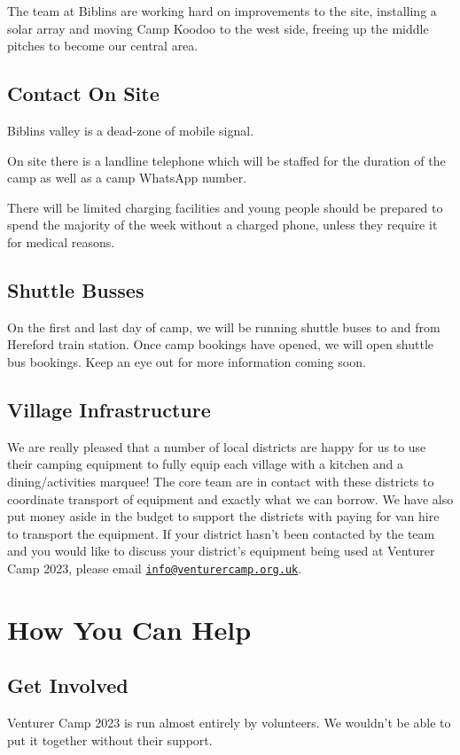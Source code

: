 \documentclass[a4paper, 10pt]{report}
\begin{document}
The team at Biblins are working hard on improvements to the site, installing a solar array and moving Camp Koodoo to the west side, freeing up the middle pitches to become our central area. 
\section{Contact On Site}
Biblins valley is a dead-zone of mobile signal.

On site there is a landline telephone which will be staffed for the duration of the camp as well as a camp WhatsApp number.

There will be limited charging facilities and young people should be prepared to spend the majority of the week without a charged phone, unless they require it for medical reasons.
\section{Shuttle Busses}
On the first and last day of camp, we will be running shuttle buses to and from Hereford train station. Once camp bookings have opened, we will open shuttle bus bookings. Keep an eye out for more information coming soon.
\section{Village Infrastructure}
We are really pleased that a number of local districts are happy for us to use their camping equipment to fully equip each village with a kitchen and a dining/activities marquee! The core team are in contact with these districts to coordinate transport of equipment and exactly what we can borrow. We have also put money aside in the budget to support the districts with paying for van hire to transport the equipment. If your district hasn't been contacted by the team and you would like to discuss your district's equipment being used at Venturer Camp 2023, please email \href{mailto:info@venturercamp.org.uk}{\texttt{info@venturercamp.org.uk}}.


\chapter{How You Can Help}
\section{Get Involved}
Venturer Camp 2023 is run almost entirely by volunteers. We wouldn't be able to put it together without their support.
\end{document}
